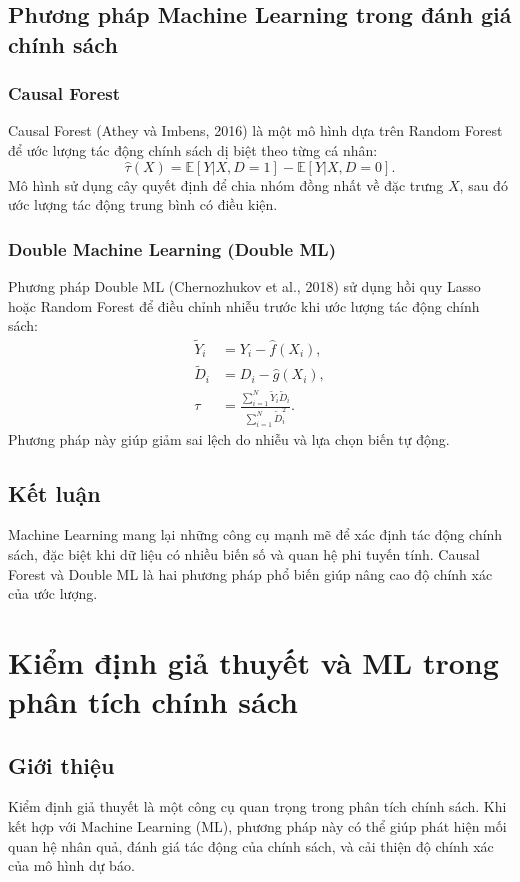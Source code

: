 \subsection{Phương pháp Machine Learning trong đánh giá chính sách}

\subsubsection{Causal Forest}
Causal Forest (Athey và Imbens, 2016) là một mô hình dựa trên Random Forest để ước lượng tác động chính sách dị biệt theo từng cá nhân:
\begin{equation}
    \hat{\tau}(X) = \mathbb{E}[Y | X, D=1] - \mathbb{E}[Y | X, D=0].
\end{equation}
Mô hình sử dụng cây quyết định để chia nhóm đồng nhất về đặc trưng $X$, sau đó ước lượng tác động trung bình có điều kiện.

\subsubsection{Double Machine Learning (Double ML)}
Phương pháp Double ML (Chernozhukov et al., 2018) sử dụng hồi quy Lasso hoặc Random Forest để điều chỉnh nhiễu trước khi ước lượng tác động chính sách:
\begin{align}
    \tilde{Y}_i &= Y_i - \hat{f}(X_i), \\
    \tilde{D}_i &= D_i - \hat{g}(X_i), \\
    \tau &= \frac{\sum_{i=1}^{N} \tilde{Y}_i \tilde{D}_i}{\sum_{i=1}^{N} \tilde{D}_i^2}.
\end{align}
Phương pháp này giúp giảm sai lệch do nhiễu và lựa chọn biến tự động.

\subsection{Kết luận}
Machine Learning mang lại những công cụ mạnh mẽ để xác định tác động chính sách, đặc biệt khi dữ liệu có nhiều biến số và quan hệ phi tuyến tính. Causal Forest và Double ML là hai phương pháp phổ biến giúp nâng cao độ chính xác của ước lượng.






\section{Kiểm định giả thuyết và ML trong phân tích chính sách}
\subsection{Giới thiệu}
Kiểm định giả thuyết là một công cụ quan trọng trong phân tích chính sách. Khi kết hợp với Machine Learning (ML), phương pháp này có thể giúp phát hiện mối quan hệ nhân quả, đánh giá tác động của chính sách, và cải thiện độ chính xác của mô hình dự báo.

